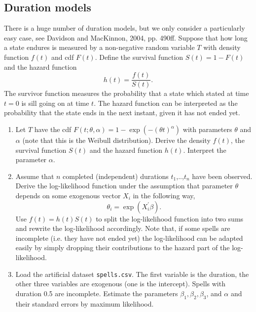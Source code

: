 \documentclass{article}
\begin{document}
\subsection{Duration models\label{duration}}

There is a huge number of duration models, but we only consider a
particularly easy case, see Davidson and MacKinnon, 2004, pp. 490ff. Suppose
that how long a state endures is measured by a non-negative random variable $%
T$ with density function $f(t)$ and cdf $F(t)$. Define the survival function
$S(t)=1-F(t)$ and the hazard function%
\begin{equation*}
h\left( t\right) =\frac{f\left( t\right) }{S\left( t\right) }.
\end{equation*}%
The survivor function measures the probability that a state which stated at time $t=0$ is sill going on at time $t$. The hazard function can be interpreted as the probability that the state
ends in the next instant, given it has not ended yet.

\begin{enumerate}\setlength{\itemsep}{0pt}
\item Let $T$ have the cdf $F(t;\theta ,\alpha )=1-\exp \left( -\left( \theta t\right) ^{\alpha}\right)$
with parameters $\theta $ and $\alpha $ (note that this is the Weibull distribution). Derive the density $f\left(
t\right) $, the survival function $S(t)$ and the hazard function $h(t)$. Interpret the parameter $\alpha$.

\item Assume that $n$ completed (independent) durations $t_{1}$,..,$t_{n}$
have been observed. Derive the log-likelihood function under the assumption that parameter $\theta $ depends on some exogenous vector $X_{i} $ in the following way,
\begin{equation*}
\theta _{i}=\exp \left( X_{i}^{\prime }\beta \right) .
\end{equation*} Use $f(t)=h(t)S(t)$ to split the log-likelihood function into two sums and rewrite the log-likelihood accordingly. Note that, if some spells are incomplete (i.e. they have not ended yet) the log-likelihood can be adapted easily by simply dropping their contributions to the hazard part of the log-likelihood.

\item Load the artificial dataset \texttt{spells.csv}. The first variable is
the duration, the other three variables are exogenous (one is the
intercept). Spells with duration 0.5 are incomplete. Estimate the parameters
$\beta _{1},\beta _{2},\beta _{3}$, and $\alpha $ and their standard errors
by maximum likelihood.
\end{enumerate}
\end{document}
